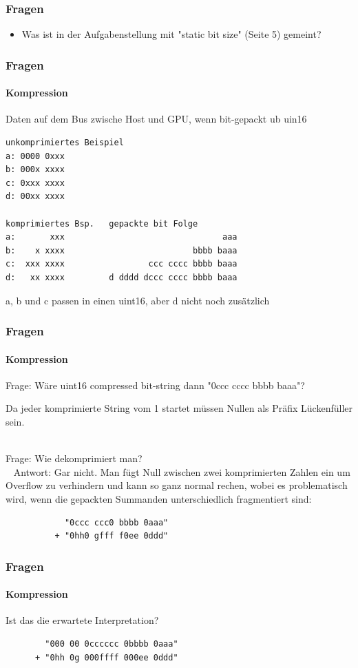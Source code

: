 \documentclass{beamer}
\begin{document}
\begin{frame}
    \frametitle{Fragen}
    \begin{itemize}
        \item Was ist in der Aufgabenstellung mit "static bit size" (Seite 5) gemeint?
    \end{itemize}
\end{frame}

\begin{frame}[fragile]
    \frametitle{Fragen}
    \framesubtitle{Kompression}
    Daten auf dem Bus zwische Host und GPU, wenn bit-gepackt ub uin16
    \begin{lstlisting}
unkomprimiertes Beispiel
a: 0000 0xxx
b: 000x xxxx
c: 0xxx xxxx
d: 00xx xxxx

komprimiertes Bsp.   gepackte bit Folge
a:       xxx                                aaa
b:    x xxxx                          bbbb baaa
c:  xxx xxxx                 ccc cccc bbbb baaa
d:   xx xxxx         d dddd dccc cccc bbbb baaa
    \end{lstlisting}
    a, b und c passen in einen uint16, aber d nicht noch zusätzlich
\end{frame}

\begin{frame}[fragile]
    \frametitle{Fragen}
    \framesubtitle{Kompression}
    Frage: Wäre uint16 compressed bit-string dann
           "0ccc cccc bbbb baaa"?

    Da jeder komprimierte String vom 1 startet müssen Nullen als
    Präfix Lückenfüller sein.\\~

    Frage: Wie dekomprimiert man?\\~
    Antwort: Gar nicht. Man fügt Null zwischen zwei komprimierten Zahlen ein um
                        Overflow zu verhindern und kann so ganz normal rechen,
                        wobei es problematisch wird, wenn die gepackten Summanden
                        unterschiedlich fragmentiert sind:
    \begin{lstlisting}
            "0ccc ccc0 bbbb 0aaa"
          + "0hh0 gfff f0ee 0ddd"
    \end{lstlisting}
\end{frame}

\begin{frame}[fragile]
    \frametitle{Fragen}
    \framesubtitle{Kompression}
    Ist das die erwartete Interpretation?
    \begin{lstlisting}
        "000 00 0cccccc 0bbbb 0aaa"
      + "0hh 0g 000ffff 000ee 0ddd"
    \end{lstlisting}
\end{frame}

\end{document}
